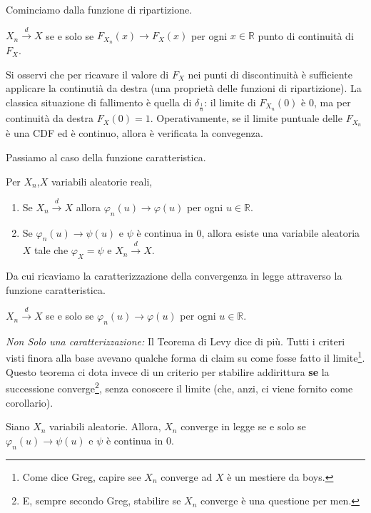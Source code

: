 Cominciamo dalla funzione di ripartizione.

\begin{my_theorem}
	$X_n \xrightarrow{d} X$ se e solo se $F_{X_n}(x) \to F_X(x)$ per ogni $x\in\mathbb{R}$ punto di continuità di $F_X$.
\end{my_theorem}

Si osservi che per ricavare il valore di $F_X$ nei punti di discontinuità è sufficiente applicare la continutià da destra (una proprietà delle funzioni di ripartizione).
La classica situazione di fallimento è quella di $\delta_{\frac{1}{n}}$: il limite di $F_{X_n}(0)$ è $0$, ma per continuità da destra $F_X(0)=1$.
Operativamente, se il limite puntuale delle $F_{X_n}$ è una CDF ed è continuo, allora è verificata la convegenza.

Passiamo al caso della funzione caratteristica.

\begin{my_theorem}[Levy]
	\label{levy} Per $X_n$,$X$ variabili aleatorie reali,
	\begin{enumerate}
		\item Se $X_n \xrightarrow{d} X$ allora $\varphi_n(u) \to \varphi(u)$ per ogni $u \in \mathbb{R}$.
		\item Se $\varphi_n(u) \to \psi(u)$ e $\psi$ è continua in $0$, allora esiste una variabile aleatoria $X$ tale che $\varphi_X = \psi$ e $X_n \xrightarrow{d} X$.
	\end{enumerate}
\end{my_theorem}

Da cui ricaviamo la caratterizzazione della convergenza in legge attraverso la funzione caratteristica.

\begin{my_corollary}[CF Criterion]
	$X_n \xrightarrow{d} X$ se e solo se $\varphi_n(u) \to \varphi(u)$ per ogni $u\in\mathbb{R}$.
\end{my_corollary}

\emph{Non Solo una caratterizzazione:} Il Teorema di Levy dice di più. Tutti i criteri visti finora alla base avevano qualche forma di claim su come fosse fatto il limite\footnote{Come dice Greg, capire see $X_n$ converge ad $X$ è un mestiere da boys.}. Questo teorema ci dota invece di un criterio per stabilire addirittura \textbf{se} la successione converge\footnote{E, sempre secondo Greg, stabilire se $X_n$ converge è una questione per men.}, senza conoscere il limite (che, anzi, ci viene fornito come corollario).

\begin{my_corollary}[Convergenza]
	Siano $X_n$ variabili aleatorie. Allora, $X_n$ converge in legge se e solo se $\varphi_n(u) \to \psi(u)$ e $\psi$ è continua in $0$.
\end{my_corollary}

